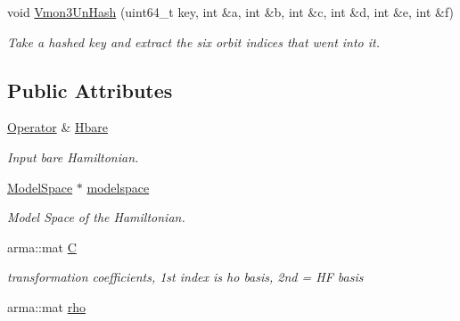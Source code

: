 \begin{DoxyCompactItemize}
\item 
\mbox{\label{classHartreeFock_af675589807ed0369ce3c9ef30d9d625b}} 
void \hyperlink{classHartreeFock_af675589807ed0369ce3c9ef30d9d625b}{Vmon3\+Un\+Hash} (uint64\+\_\+t key, int \&a, int \&b, int \&c, int \&d, int \&e, int \&f)
\begin{DoxyCompactList}\small\item\em Take a hashed key and extract the six orbit indices that went into it. \end{DoxyCompactList}\end{DoxyCompactItemize}
\subsection*{Public Attributes}
\begin{DoxyCompactItemize}
\item 
\mbox{\label{classHartreeFock_aad1a5eeadedf9689bbfc2e3d71b60aee}} 
\hyperlink{classOperator}{Operator} \& \hyperlink{classHartreeFock_aad1a5eeadedf9689bbfc2e3d71b60aee}{Hbare}
\begin{DoxyCompactList}\small\item\em Input bare Hamiltonian. \end{DoxyCompactList}\item 
\mbox{\label{classHartreeFock_a5d4a6814a338d7e4c17575ac74763f30}} 
\hyperlink{classModelSpace}{Model\+Space} $\ast$ \hyperlink{classHartreeFock_a5d4a6814a338d7e4c17575ac74763f30}{modelspace}
\begin{DoxyCompactList}\small\item\em Model Space of the Hamiltonian. \end{DoxyCompactList}\item 
\mbox{\label{classHartreeFock_a9c73247cdb9255cebabaacc99ec55086}} 
arma\+::mat \hyperlink{classHartreeFock_a9c73247cdb9255cebabaacc99ec55086}{C}
\begin{DoxyCompactList}\small\item\em transformation coefficients, 1st index is ho basis, 2nd = HF basis \end{DoxyCompactList}\item 
\mbox{\label{classHartreeFock_a6fc0aa9f25640979d5188443a19aeea5}} 
arma\+::mat \hyperlink{classHartreeFock_a6fc0aa9f25640979d5188443a19aeea5}{rho}

\end{DoxyCompactItemize}
